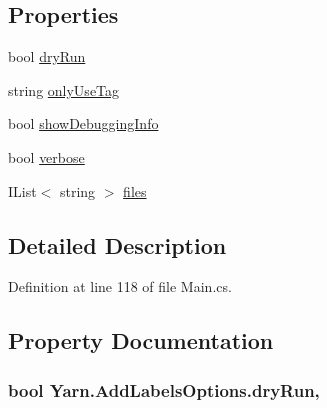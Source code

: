 \subsection*{Properties}
\begin{DoxyCompactItemize}
\item 
bool \hyperlink{a00037_a5dc9d9db767738237e988f95fc0330f4}{dry\-Run}
\item 
string \hyperlink{a00037_ab6162338f9606a836f3101fe0e228249}{only\-Use\-Tag}
\item 
bool \hyperlink{a00041_a89964ea17bd19caf00cb5bff563ed01c}{show\-Debugging\-Info}
\item 
bool \hyperlink{a00041_ada4d83d1756918f362d55f6649b82b17}{verbose}
\item 
I\-List$<$ string $>$ \hyperlink{a00041_aa93cbb1bc1d5328e0a417012621e92d2}{files}
\end{DoxyCompactItemize}


\subsection{Detailed Description}


Definition at line 118 of file Main.\-cs.



\subsection{Property Documentation}
\hypertarget{a00037_a5dc9d9db767738237e988f95fc0330f4}{
\subsubsection[{dry\-Run}]{\setlength{\rightskip}{0pt plus 5cm}bool Yarn.\-Add\-Labels\-Options.\-dry\-Run\hspace{0.3cm}{\ttfamily [get]}, {\ttfamily [set]}}}\label{a00037_a5dc9d9db767738237e988f95fc0330f4}


